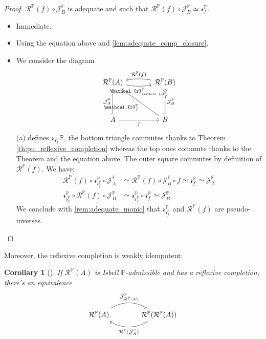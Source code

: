 \documentclass[10pt,a4paper]{article}
\newcommand{\bb}[1]{\mathbb{#1}}
\newcommand{\ca}[1]{\mathcal{#1}}
\newcommand{\PP}{{\bb P}}
\theoremstyle{plain}
\newtheorem{corollary}[theorem]{Corollary}
\theoremstyle{definition}
\theoremstyle{remark}
\begin{document}
\begin{proof}
    $\ca{R}^\PP(f) \circ \ca{J}_B^\PP$ is adequate and such that $\ca{R}^\PP(f) \circ \ca{J}_B^\PP \simeq \ca{r}_f^\PP$.
    \begin{itemize}
        \item[\underline{(c)$\implies$(b)}:] Immediate.
        \item[\underline{(b)$\implies$(a)}:] Using the equation above and \ref{lem:adequate_comp_closure}.
        \item[\underline{(a)$\implies$(c)}:] We consider the diagram
            \[\begin{tikzcd}[row sep=huge,column sep=large]
                \ca{R}^\PP(A) \ar[r, bend right=10, "\ca{r}_{\ca{r}_f^\PP}^\PP"'] & \ar[l, bend right=10, "\ca{R}^\PP(f)"'] \ca{R}^\PP(B)\\
                A \ar[u, hook, "\ca{J}_A^\PP"] \ar[r, "f"'] & \ar[ul, "\ca{r}_f^\PP"] B \ar[u, hook, "\ca{J}_B^\PP"']
            \end{tikzcd}\]
            (a) defines $\ca{r}_{\ca{r}_f^\PP}\PP$, the bottom triangle commutes thanks to Theorem \ref{th:pu_reflexive_completion} whereas the top ones commute thanks to the Theorem and the equation above. The outer square commutes by definition of $\ca{R}^\PP(f)$. We have:
            \begin{align*}
                \ca{R}^\PP(f)\circ\ca{r}_{\ca{r}_f^\PP}^\PP\circ\ca{J}_A^\PP &\simeq\ca{R}^\PP(f)\circ\ca{J}_B^\PP\circ f\simeq\ca{r}_f^\PP\simeq\ca{J}_A^\PP\\
                \ca{r}_{\ca{r}_f^\PP}^\PP\circ\ca{R}^\PP(f)\circ\ca{J}_B^\PP &\simeq\ca{r}_{\ca{r}_f^\PP}^\PP\circ\ca{r}_f^\PP\simeq\ca{J}_B^\PP
            \end{align*}
            We conclude with \ref{rem:adequate_monic} that $\ca{r}_{\ca{r}_f^\PP}^\PP$ and $\ca{R}^\PP(f)$ are pseudo-inverses.
    \end{itemize}
\end{proof}

Moreover, the reflexive completion is weakly idempotent:

\begin{corollary}[{\cite[Corollary 9.4]{averyleinster}}]
    \label{cor:rr_equiv_r}
    If $\ca{R}^\PP(A)$ is Isbell $\PP$-admissible and has a reflexive completion, there's an equivalence
    \[\begin{tikzcd}[column sep=large]
        \ca{R}^\PP(A) \ar[r, bend left, "\ca{J}_{\ca{R}^\PP(A)}^\PP"] & \ar[l, bend left, "\ca{R}^\PP(\ca{J}_A^\PP)"] \ca{R}^\PP(\ca{R}^\PP(A))
    \end{tikzcd}\]
\end{corollary}
\end{document}
